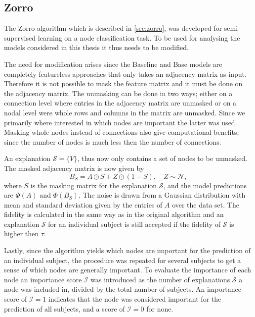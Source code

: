 \subsection{Zorro}

The Zorro algorithm which is described in \ref{sec:zorro}, was developed for semi-supervised learning on a node classification task. To be used for analysing the models considered in this thesis it thus needs to be modified.

The need for modification arises since the Baseline and Base models are completely featureless approaches that only takes an adjacency matrix as input. Therefore it is not possible to mask the feature matrix and it must be done on the adjacency matrix. The unmasking can be done in two ways; either on a connection level where entries in the adjacency matrix are unmasked or on a nodal level were whole rows and columns in the matrix are unmasked. Since we primarily where interested in which nodes are important the latter was used. Masking whole nodes instead of connections also give computational benefits, since the number of nodes is much less then the number of connections. 

An explanation $\mathcal{S} = \{V\}$, thus now only contains a set of nodes to be unmasked. The masked adjacency matrix is now given by 
\begin{equation*}
    B_S = A \odot S + Z \odot (1- S), \quad Z \sim \mathcal{N},
\end{equation*}
where $S$ is the masking matrix for the explanation $\mathcal{S}$, and the model predictions are $\Phi(A)$ and $\Phi(B_S)$. The noise is drawn from a Gaussian distribution with mean and standard deviation given by the entries of $A$ over the data set. The fidelity is calculated in the same way as in the original algorithm and an explanation $\mathcal{S}$ for an individual subject is still accepted if the fidelity of $\mathcal{S}$ is higher then $\tau$. 

Lastly, since the algorithm yields which nodes are important for the prediction of an individual subject, the procedure was repeated for several subjects to get a sense of which nodes are generally important. To evaluate the importance of each node an importance score $\mathcal{I}$ was introduced as the number of explanations $\mathcal{S}$ a node was included in, divided by the total number of subjects. An importance score of $\mathcal{I}=1$ indicates that the node was considered important for the prediction of all subjects, and a score of $\mathcal{I}=0$ for none.  


